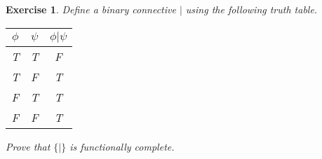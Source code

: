 \documentclass{article}
\theoremstyle{plain}
\newtheorem{Q}[theorem]{Exercise}{\bfseries}{\upshape}
\newcommand{\lequiv}{\models\text{\reflectbox{$\models$}}}
\begin{document}
\begin{Q}
Define a binary connective $|$ using the following truth table.

{\centering
\begin{tabular}{ c c c  }
 $\phi$ & $\psi$ & $\phi| \psi$ \\ \hline 
 T & T & F \\  
 T & F & T \\
 F & T & T \\
 F & F & T    
\end{tabular}\par}

Prove that $\{|\}$ is functionally complete.
\end{Q}
\begin{comment}
\textbf{Solution:} 
We will do this by showing that if $\phi$ is a sentence involving only symbols from $\{\wedge,\neg\}$, there is a sentence $\phi'$ using only $|$ such that $\phi\lequiv \phi'$. This is enough because we already proved that $\{\wedge,\neg\}$ is functionally complete. We use the same inductive method as before, and the base case is again trivial.

So suppose $\phi = \neg\psi$ and we already have $\psi'$.  Observe that

{\centering
\begin{tabular}{ c c c c }
 $\psi$ & $\neg\psi$ & $\psi| \psi$ \\ \hline 
 T & F & F \\  
 F & T & T   
\end{tabular}\par} 
So we can define $\phi' = \psi'|\psi'$.

Suppose now that $\phi = \psi_1\wedge \psi_2$ and we already have $\psi_1'$ and $\psi_2'$. Observe that

{\centering
\begin{tabular}{ c c c c c }
 $\psi_1$ & $\psi_2$ & $\psi_1\wedge \psi_2$ & $\psi_1|\psi_2$ & $(\psi_1|\psi_2)|(\psi_1|\psi_2)$ \\ \hline 
 T & T & T & F & T \\  
 T & F & F & T & F \\
 F & T & F & T & F \\
 F & F & F & T & F 
\end{tabular}\par}
So we can define $\phi' = (\psi'_1|\psi'_2)|(\psi'_1|\psi'_2)$.
\end{comment}
\end{document}
